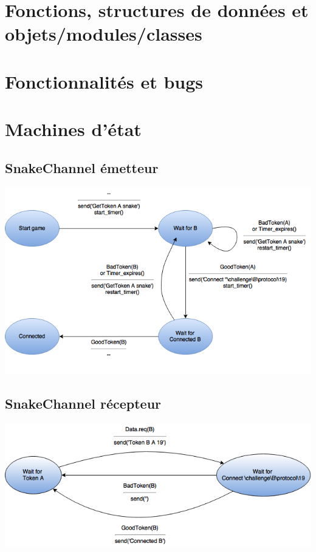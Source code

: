 \documentclass[a4paper]{article}
\begin{document}
\section{Fonctions, structures de données et objets/modules/classes}

\section{Fonctionnalités et bugs}



\section{Machines d'état}
\subsection{SnakeChannel émetteur}
\begin{center}
\includegraphics[scale=0.7]{sc_emetteur.png}
\end{center}
\subsection{SnakeChannel récepteur}
\begin{center}
\includegraphics[scale=0.7]{sc_recepteur.png}
\end{center}
\end{document}
